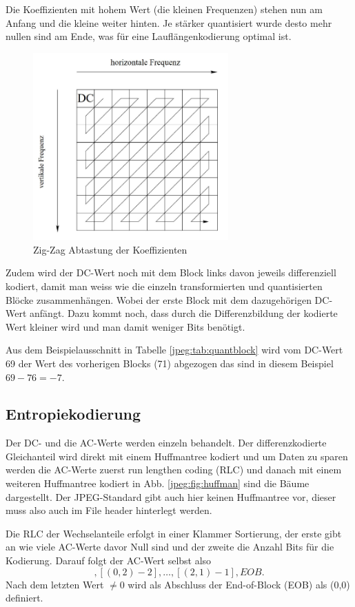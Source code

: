 Die Koeffizienten mit hohem Wert (die kleinen Frequenzen) stehen nun am Anfang und die kleine weiter hinten.
Je stärker quantisiert wurde desto mehr nullen sind am Ende, was für eine Lauflängenkodierung optimal ist.

\begin{figure}
    \centering
    \includegraphics[width=75mm]{papers/jpeg/pictures/zigzag.pdf}
    \caption{Zig-Zag Abtastung der Koeffizienten
        \label{jpeg:fig:zigzag}}
\end{figure}

Zudem wird der DC-Wert noch mit dem Block links davon jeweils differenziell kodiert, damit man weiss wie die einzeln transformierten und quantisierten Blöcke zusammenhängen.
Wobei der erste Block mit dem dazugehörigen DC-Wert anfängt.
Dazu kommt noch, dass durch die Differenzbildung der kodierte Wert kleiner wird und man damit weniger Bits benötigt.

Aus dem Beispielausschnitt in Tabelle \ref{jpeg:tab:quantblock} wird vom DC-Wert 69 der Wert des vorherigen Blocks (71) abgezogen das sind in diesem Beispiel \(69-76 = -7\).

\subsection{Entropiekodierung
\label{jpeg:subsection:entropiekodierung}}
Der DC- und die AC-Werte werden einzeln behandelt.
Der differenzkodierte Gleichanteil wird direkt mit einem Huffmantree kodiert und um Daten zu sparen werden die AC-Werte zuerst run lengthen coding (RLC) und danach mit einem weiteren Huffmantree kodiert in Abb. \ref{jpeg:fig:huffman} sind die Bäume dargestellt.
Der JPEG-Standard gibt auch hier keinen Huffmantree vor, dieser muss also auch im File header hinterlegt werden.

Die RLC der Wechselanteile erfolgt in einer Klammer Sortierung, der erste gibt an wie viele AC-Werte davor Null sind und der zweite die Anzahl  Bits für die Kodierung.
Darauf folgt der AC-Wert selbst also 
\begin{equation}
    [(0,3)5],[(0,2)-2], \dots, [(2,1)-1], EOB.
\end{equation}
Nach dem letzten Wert \(\neq 0\) wird als Abschluss der End-of-Block (EOB) als (0,0) definiert.

